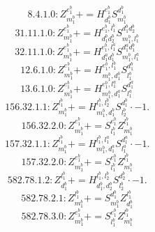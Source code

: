 \documentclass[letterpaper,10pt,fleqn,leqno,onecolumn]{article}
\begin{document}
\begin{equation} \;\;\;\;\;\;  8.4.1.0: Z^{e_{1}^{b}}_{m_{1}^{b}}+=H^{e_{1}^{b}}_{d_{1}^{b}}S^{d_{1}^{b}}_{m_{1}^{b}} \end{equation}
\begin{equation} \;\;\;\;\;\;  31.11.1.0: Z^{e_{1}^{b}}_{m_{1}^{b}}+=H^{e_{1}^{b},l_{1}^{b}}_{d_{1}^{b}d_{2}^{b}}S^{d_{1}^{b}d_{2}^{b}}_{m_{1}^{b},l_{1}^{b}} \end{equation}
\begin{equation} \;\;\;\;\;\;  32.11.1.0: Z^{e_{1}^{b}}_{m_{1}^{b}}+=H^{e_{1}^{b},l_{1}^{a}}_{d_{1}^{a}d_{1}^{b}}S^{d_{1}^{a}d_{1}^{b}}_{m_{1}^{b},l_{1}^{a}} \end{equation}
\begin{equation} \;\;\;\;\;\;  12.6.1.0: Z^{e_{1}^{b}}_{m_{1}^{b}}+=H^{e_{1}^{b},l_{1}^{b}}_{m_{1}^{b},d_{1}^{b}}S^{d_{1}^{b}}_{l_{1}^{b}} \end{equation}
\begin{equation} \;\;\;\;\;\;  13.6.1.0: Z^{e_{1}^{b}}_{m_{1}^{b}}+=H^{e_{1}^{b},l_{1}^{a}}_{m_{1}^{b},d_{1}^{a}}S^{d_{1}^{a}}_{l_{1}^{a}} \end{equation}
\begin{equation} \;\;\;\;\;\;  156.32.1.1: Z^{l_{1}^{b}}_{m_{1}^{b}}+=H^{l_{1}^{b},l_{2}^{b}}_{m_{1}^{b},d_{1}^{b}}S^{d_{1}^{b}}_{l_{2}^{b}}\cdot -1. \end{equation}
\begin{equation} \;\;\;\;\;\;  156.32.2.0: Z^{e_{1}^{b}}_{m_{1}^{b}}+=S^{e_{1}^{b}}_{l_{1}^{b}}Z^{l_{1}^{b}}_{m_{1}^{b}} \end{equation}
\begin{equation} \;\;\;\;\;\;  157.32.1.1: Z^{l_{1}^{b}}_{m_{1}^{b}}+=H^{l_{1}^{b},l_{1}^{a}}_{m_{1}^{b},d_{1}^{a}}S^{d_{1}^{a}}_{l_{1}^{a}}\cdot -1. \end{equation}
\begin{equation} \;\;\;\;\;\;  157.32.2.0: Z^{e_{1}^{b}}_{m_{1}^{b}}+=S^{e_{1}^{b}}_{l_{1}^{b}}Z^{l_{1}^{b}}_{m_{1}^{b}} \end{equation}
\begin{equation} \;\;\;\;\;\;  582.78.1.2: Z^{l_{1}^{b}}_{d_{1}^{b}}+=H^{l_{1}^{b},l_{2}^{b}}_{d_{1}^{b},d_{2}^{b}}S^{d_{2}^{b}}_{l_{2}^{b}}\cdot -1. \end{equation}
\begin{equation} \;\;\;\;\;\;  582.78.2.1: Z^{l_{1}^{b}}_{m_{1}^{b}}+=S^{d_{1}^{b}}_{m_{1}^{b}}Z^{l_{1}^{b}}_{d_{1}^{b}} \end{equation}
\begin{equation} \;\;\;\;\;\;  582.78.3.0: Z^{e_{1}^{b}}_{m_{1}^{b}}+=S^{e_{1}^{b}}_{l_{1}^{b}}Z^{l_{1}^{b}}_{m_{1}^{b}} \end{equation}
\end{document}
